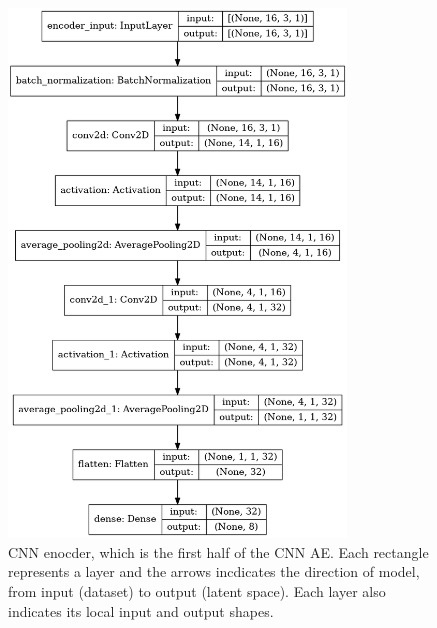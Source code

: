 \documentclass[a4paper]{article}
\theoremstyle{plain}
\theoremstyle{definition}
\begin{document}
			\begin{figure}[H]
				\centering
					\begin{minipage}[c]{0.45\linewidth}
						\centering
						\includegraphics[width=0.8\textwidth]{encoder.png}
						\caption{CNN enocder, which is the first half of the CNN AE. Each rectangle represents a layer and the arrows incdicates the direction of model, from input (dataset) to output (latent space). Each layer also indicates its local input and output shapes. }
						\label{fig:cnn-encoder}
					\end{minipage}
				\hfill
					\begin{minipage}[c]{0.45\linewidth}
						\centering

\end{minipage}
\end{figure}
\end{document}
